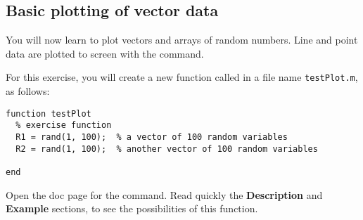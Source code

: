\documentclass{article}
\begin{document}
\subsection{Basic plotting of vector data}

You will now learn to plot vectors and arrays of random numbers.
Line and point data are plotted to screen with the  command.

For this exercise, you will create a new function called  in a file name \verb|testPlot.m|, as follows:
\begin{lstlisting}
function testPlot
  % exercise function
  R1 = rand(1, 100);  % a vector of 100 random variables
  R2 = rand(1, 100);  % another vector of 100 random variables

end
\end{lstlisting}

Open the doc page for the  command.
Read quickly the \textbf{Description} and \textbf{Example} sections, to see the possibilities of this function.
\end{document}
